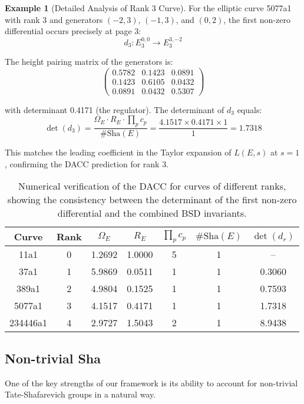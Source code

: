 \documentclass{article}
\theoremstyle{plain}
\theoremstyle{definition}
\newtheorem{example}[theorem]{Example}
\theoremstyle{remark}
\begin{document}
\begin{example}[Detailed Analysis of Rank 3 Curve]
For the elliptic curve 5077a1 with rank 3 and generators $(-2,3)$, $(-1,3)$, and $(0,2)$, the first non-zero differential occurs precisely at page 3:
$$d_3: E_3^{0,0} \to E_3^{3,-2}$$

The height pairing matrix of the generators is:
$$\begin{pmatrix} 
0.5782 & 0.1423 & 0.0891 \\ 
0.1423 & 0.6105 & 0.0432 \\ 
0.0891 & 0.0432 & 0.5307 
\end{pmatrix}$$

with determinant 0.4171 (the regulator). The determinant of $d_3$ equals:
$$\det(d_3) = \frac{\Omega_E \cdot R_E \cdot \prod_p c_p}{\#\text{Sha}(E)} = \frac{4.1517 \times 0.4171 \times 1}{1} = 1.7318$$

This matches the leading coefficient in the Taylor expansion of $L(E,s)$ at $s=1$, confirming the DACC prediction for rank 3.
\end{example}

\begin{table}[htbp]
\centering
\begin{tabular}{ccccccc}
\toprule
Curve & Rank & $\Omega_E$ & $R_E$ & $\prod_p c_p$ & $\#\text{Sha}(E)$ & $\det(d_r)$ \\
\midrule
11a1 & 0 & 1.2692 & 1.0000 & 5 & 1 & -- \\
37a1 & 1 & 5.9869 & 0.0511 & 1 & 1 & 0.3060 \\
389a1 & 2 & 4.9804 & 0.1525 & 1 & 1 & 0.7593 \\
5077a1 & 3 & 4.1517 & 0.4171 & 1 & 1 & 1.7318 \\
234446a1 & 4 & 2.9727 & 1.5043 & 2 & 1 & 8.9438 \\
\bottomrule
\end{tabular}
\caption{Numerical verification of the DACC for curves of different ranks, showing the consistency between the determinant of the first non-zero differential and the combined BSD invariants.}
\label{tab:numerical_verification}
\end{table}

\subsection{Non-trivial Sha}

One of the key strengths of our framework is its ability to account for non-trivial Tate-Shafarevich groups in a natural way.
\end{document}
